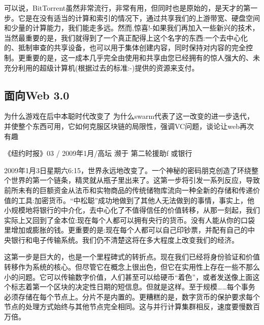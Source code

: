 可以说，BitTorrent虽然非常流行，非常有用，但同时也是原始的，是天才的第一步。它是在没有适当的计算和索引的情况下，通过共享我们的上游带宽、硬盘空间和少量的计算能力，我们能走多远。然而,惊喜!-如果我们再加入一些新兴的技术，当然最重要的是，我们就得到了一个真正配得上这个名字的东西:一个去中心化的、抵制审查的共享设备，也可以用于集体创建内容，同时保持对内容的完全控制。更重要的是，这一成本几乎完全由使用和共享由您已经拥有的惊人强大的、未充分利用的超级计算机(根据过去的标准:-)提供的资源来支付。

\subsection{面向Web 3.0 \statusgreen}\label{sec:towards-web3}

为什么游戏在后中本聪时代改变了
为什么swarm代表了这一改变的进一步迭代，并使整个东西可用，它如何克服区块链的局限性，强调VC问题，谈论让web再次有趣

\begin{centerverbatim}
《纽约时报》03 /
2009年1月/高坛
濒于
第二轮援助f
或银行
\end{centerverbatim}

2009年1月3日星期六6:15，世界永远地改变了。一个神秘的密码朋克创造了环绕整个世界的第一个链条，精灵就从瓶子里出来了。这第一步将引发一系列反应，导致前所未有的巨额资金从法币和实物商品的传统储物库流向一种全新的存储和传递价值的工具:加密货币。“中松聪”成功地做到了其他人无法做到的事情，事实上，他小规模地将银行的中介化，去中心化了不值得信任的价值转移，从那一刻起，我们实际上又回到了金本位:现在每个人都可以拥有央行的货币。没有人能从你的口袋里增加或膨胀的钱。更重要的是:现在每个人都可以自己印钞票，并配有自己的中央银行和电子传输系统。我们仍不清楚这将在多大程度上改变我们的经济。

这第一步是巨大的，也是一个里程碑式的转折点。现在我们已经将身份验证和价值转移作为系统的核心。但尽管它在概念上很出色，但它在实用性上存在一些不那么小的问题。它可以传输数字价值，人们甚至可以给硬币“着色”，或者发送像上面这个标志着第一个区块的决定性日期的短信息。但就是这样。至于规模……每个事务必须存储在每个节点上。分片不是内置的。更糟糕的是，数字货币的保护要求每个节点的处理方式始终与其他节点完全相同。这与并行计算集群相反，速度要慢数百万倍。

